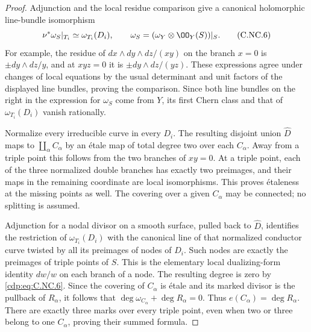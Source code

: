 \begin{proof}
Adjunction and the local residue comparison give a canonical holomorphic line-bundle isomorphism
\[
 \nu^*\omega_S|_{T_i}\simeq\omega_{T_i}(D_i),
 \qquad \omega_S=(\omega_Y\otimes\OO_Y(S))|_S.
 \tag{C.NC.6}\label{cdp:eq:C.NC.6}
\]
For example, the residue of $dx\wedge dy\wedge dz/(xy)$ on the branch $x=0$ is $\pm dy\wedge dz/y$, and at $xyz=0$ it is $\pm dy\wedge dz/(yz)$. These expressions agree under changes of local equations by the usual determinant and unit factors of the displayed line bundles, proving the comparison. Since both line bundles on the right in the expression for $\omega_S$ come from $Y$, its first Chern class and that of $\omega_{T_i}(D_i)$ vanish rationally.

Normalize every irreducible curve in every $D_i$. The resulting disjoint union $\widehat D$ maps to $\coprod_\alpha C_\alpha$ by an étale map of total degree two over each $C_\alpha$. Away from a triple point this follows from the two branches of $xy=0$. At a triple point, each of the three normalized double branches has exactly two preimages, and their maps in the remaining coordinate are local isomorphisms. This proves étaleness at the missing points as well. The covering over a given $C_\alpha$ may be connected; no splitting is assumed.

Adjunction for a nodal divisor on a smooth surface, pulled back to $\widehat D$, identifies the restriction of $\omega_{T_i}(D_i)$ with the canonical line of that normalized conductor curve twisted by all its preimages of nodes of $D_i$. Such nodes are exactly the preimages of triple points of $S$. This is the elementary local dualizing-form identity $dw/w$ on each branch of a node. The resulting degree is zero by \eqref{cdp:eq:C.NC.6}. Since the covering of $C_\alpha$ is étale and its marked divisor is the pullback of $R_\alpha$, it follows that
$\deg\omega_{C_\alpha}+\deg R_\alpha=0$.
Thus $e(C_\alpha)=\deg R_\alpha$. There are exactly three marks over every triple point, even when two or three belong to one $C_\alpha$, proving their summed formula.


\end{proof}
